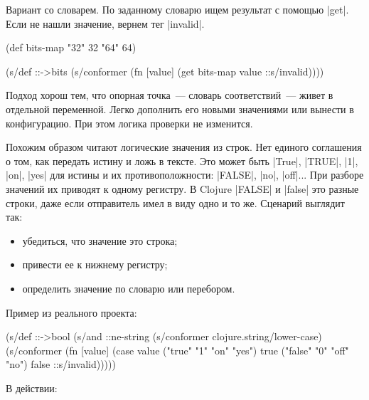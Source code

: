 Вариант со словарем. По заданному словарю ищем результат с помощью
\spverb|get|. Если не нашли значение, вернем тег \spverb|invalid|.

\begin{english}
  \begin{clojure}
(def bits-map {"32" 32 "64" 64})

(s/def ::->bits
  (s/conformer
   (fn [value]
     (get bits-map value ::s/invalid))))
  \end{clojure}
\end{english}

Подход хорош тем, что опорная точка~--- словарь соответствий~--- живет в
отдельной переменной. Легко дополнить его новыми значениями или вынести в
конфигурацию. При этом логика проверки не изменится.

Похожим образом читают логические значения из строк. Нет единого соглашения о
том, как передать истину и ложь в тексте. Это может быть \spverb|True|,
\spverb|TRUE|, \spverb|1|, \spverb|on|, \spverb|yes| для истины и их
противоположности: \spverb|FALSE|, \spverb|no|, \spverb|off|... При разборе
значений их приводят к одному регистру. В Clojure \spverb|FALSE| и
\spverb|false| это разные строки, даже если отправитель имел в виду одно и то
же. Сценарий выглядит так:

\begin{itemize}

\item
  убедиться, что значение это строка;

\item
  привести ее к нижнему регистру;

\item
  определить значение по словарю или перебором.

\end{itemize}

\noindent
Пример из реального проекта:

\begin{english}
  \begin{clojure}
(s/def ::->bool
  (s/and
   ::ne-string
   (s/conformer clojure.string/lower-case)
   (s/conformer
    (fn [value]
      (case value
        ("true" "1" "on" "yes") true
        ("false" "0" "off" "no") false
        ::s/invalid)))))

  \end{clojure}
\end{english}

\noindent
В действии:

